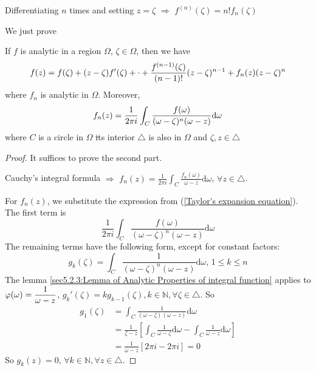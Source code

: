 
Differentiating  $ n $ times and setting  $ z=\zeta $ $ \Rightarrow $ $ f^{(n)}(\zeta) =n!f_n(\zeta)$    

We just prove 
\begin{theorem}\label{Taylor's Theorem}
    If  $ f $ is analytic in a region  $ \Omega $,  $ \zeta\in\Omega $, then we have 
    \begin{equation}
        f(z)=f(\zeta)+(z-\zeta)f'(\zeta)+\cdot+\displaystyle\frac{f^{(n-1)}(\zeta)}{(n-1)!}(z-\zeta)^{n-1}+f_n(z)(z-\zeta)^n\label{Taylor's expansion equation}
    \end{equation}   
    where  $ f_n $ is analytic in  $ \Omega $. Moreover,
    \begin{equation}
        f_n(z)=\displaystyle\frac{1}{2\pi i}\int_C\frac{f(\omega)}{(\omega-\zeta)^n(\omega-z)}\mathrm{d}\omega
    \end{equation}  
    where  $ C $ is a circle in  $ \Omega $ \st  its interior  $ \triangle $ is also in  $ \Omega $ and  $ \zeta,z\in \triangle $     
\end{theorem}
\begin{proof}
    It suffices to prove the second part.
    
    Cauchy's integral formula $ \Rightarrow  $ $ f_n(z)=\frac{1}{2\pi i}\int_C\frac{f_n(\omega)}{\omega-z}\mathrm{d}\omega $, $ \forall z\in\triangle $.
    
    For  $ f_n(z) $, we substitute the expression from  (\ref{Taylor's expansion equation}). The first term is 
    \begin{equation}
        \frac{1}{2\pi i}\int_C\frac{f(\omega)}{(\omega-\zeta)^n(\omega-z)}\mathrm{d}\omega
    \end{equation}
    The remaining terms have the following form, except for constant factors:
    \begin{equation}
        g_k(\zeta)=\int_C\frac{1}{(\omega-\zeta)^n(\omega-z)}\mathrm{d}\omega,\,1 \leq k \leq n
    \end{equation}
    The lemma \ref{sec5.2.3:Lemma of Analytic Properties of integral function} applies to  $ \varphi(\omega)=\displaystyle\frac{1}{\omega-z} $,  $ g_k'(\zeta)=kg_{k-1}(\zeta),k\in\mathbb{N},\forall \zeta\in\triangle $. So 
    \begin{equation}
        \begin{aligned}
            g_1(\zeta)&=\int_C\frac{1}{(\omega-\zeta)(\omega-z)}\mathrm{d}\omega\\
            &=\frac{1}{\zeta-z}\left[\int_C\frac{1}{\omega-\zeta}\mathrm{d}\omega-\int_C\frac{1}{\omega-z}\mathrm{d}\omega\right]\\
            &=\frac{1}{\omega-z}[2\pi i-2\pi i]=0
        \end{aligned}
    \end{equation}  
    So  $ g_k(z)=0,\,\forall k\in\mathbb{N},\forall z\in\triangle $. 
\end{proof}
